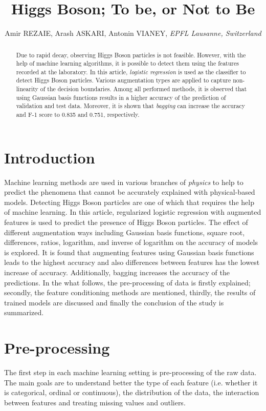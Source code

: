 \documentclass[10pt,conference,compsocconf]{IEEEtran}
\begin{document}
\title{Higgs Boson; To be, or Not to Be}

\author{
 Amir REZAIE,
 Arash ASKARI,
 Antonin VIANEY,
  \textit{EPFL Lausanne, Switzerland}
}

\maketitle

\begin{abstract}
Due to rapid decay, observing Higgs Boson particles is not feasible. However, with the help of machine learning algorithms, it is possible to detect them using the features recorded at the laboratory. In this article, \textit{logistic regression} is used as the classifier to detect Higgs Boson particles. Various augmentation types are applied to capture non-linearity of the decision boundaries. Among all performed methods, it is observed that using Gaussian basis functions results in a higher accuracy of the prediction of validation and test data. Moreover, it is shown that \textit{bagging} can increase the accuracy and F-1 score to 0.835 and 0.751, respectively. 


\end{abstract}

\section{Introduction}
Machine learning methods are used in various branches of \textit{physics} to help to predict the phenomena that cannot be accurately explained with physical-based models. Detecting Higgs Boson particles are one of which that requires the help of machine learning. 
In this article, regularized logistic regression with augmented features is used to predict the presence of Higgs Boson particles. The effect of different augmentation ways including Gaussian basis functions, square root, differences, ratios, logarithm, and inverse of logarithm on the accuracy of models is explored. It is found that augmenting features using Gaussian basis functions leads to the highest accuracy and also differences between features has the lowest increase of accuracy. Additionally, bagging increases the accuracy of the predictions. In the what follows, the pre-processing of data is firstly explained; secondly, the feature conditioning methods are mentioned, thirdly, the results of trained models are discussed and finally the conclusion of the study is summarized. 

\section{Pre-processing}
\label{sec:pre-processing}
The first step in each machine learning setting is pre-processing of the raw data. The main goals are to understand better the type of each feature (i.e. whether it is categorical, ordinal or continuous), the distribution of the data, the interaction between features and treating missing values and outliers. 
\end{document}

